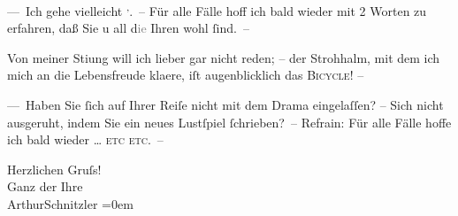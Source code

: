 \pstart
           — Ich gehe vielleicht \label{K_L03904-3v}\label{K_L03904-3}\substVorne{}\textsuperscript{,}\substDazwischen{}.\substHinten{} – Für alle Fälle hoff ich bald wieder mit 2
               Worten zu erfahren, daß Sie u all d\textcolor{gray}{ie} Ihren wohl{ }ſind. –\pend
           
\pstart
           Von meiner Sti{\geminationm}ung will ich lieber gar nicht reden; –
               der Strohhalm, mit dem ich mich an die Lebensfreude kla{\geminationm}ere, {\pb}iſt augenblicklich das \textsc{Bicycle}! –\pend
           
\pstart
           — Haben Sie{ }ſich auf Ihrer Reiſe nicht mit dem Drama eingelaſſen? –
               Sich nicht ausgeruht, indem Sie ein neues Lustſpiel{ }ſchrieben? – Refrain: Für alle
               Fälle hoffe ich bald wieder {\dots}{ }\textsc{etc}{ }\textsc{etc.} –\pend
           
\pstart
           Herzlichen Gruſs!{\\[\baselineskip]}Ganz der Ihre{\\[\baselineskip]}\spacefill\mbox{ArthurSchnitzler}\pend
           \leftskip=0em{}\endnumbering{}  \newcommand{\dateiname}{L03904}\newcommand{\titel}{Arthur Schnitzler an Theodor Herzl, 4. 8. 1893}\newcommand{\editorInnen}{Herausgegeben von Jahnke, SelmaMüller, Martin Anton}
